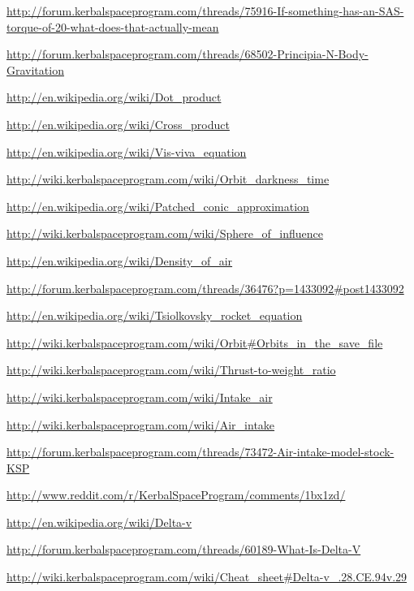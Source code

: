\documentclass[11pt]{report}
\begin{document}
\begin{thebibliography}{Kerbin}
  \url{http://forum.kerbalspaceprogram.com/threads/75916-If-something-has-an-SAS-torque-of-20-what-does-that-actually-mean}

  \url{http://forum.kerbalspaceprogram.com/threads/68502-Principia-N-Body-Gravitation}

  \url{http://en.wikipedia.org/wiki/Dot_product}

  \url{http://en.wikipedia.org/wiki/Cross_product}

  \url{http://en.wikipedia.org/wiki/Vis-viva_equation}

  \url{http://wiki.kerbalspaceprogram.com/wiki/Orbit_darkness_time}

  \url{http://en.wikipedia.org/wiki/Patched_conic_approximation}

  \url{http://wiki.kerbalspaceprogram.com/wiki/Sphere_of_influence}

  \url{http://en.wikipedia.org/wiki/Density_of_air}

  \url{http://forum.kerbalspaceprogram.com/threads/36476?p=1433092#post1433092}

  \url{http://en.wikipedia.org/wiki/Tsiolkovsky_rocket_equation}

  \url{http://wiki.kerbalspaceprogram.com/wiki/Orbit#Orbits_in_the_save_file}

  \url{http://wiki.kerbalspaceprogram.com/wiki/Thrust-to-weight_ratio}

  \url{http://wiki.kerbalspaceprogram.com/wiki/Intake_air}

  \url{http://wiki.kerbalspaceprogram.com/wiki/Air_intake}

  \url{http://forum.kerbalspaceprogram.com/threads/73472-Air-intake-model-stock-KSP}

  \url{http://www.reddit.com/r/KerbalSpaceProgram/comments/1bx1zd/}

  \url{http://en.wikipedia.org/wiki/Delta-v}

  \url{http://forum.kerbalspaceprogram.com/threads/60189-What-Is-Delta-V}

  \url{http://wiki.kerbalspaceprogram.com/wiki/Cheat_sheet#Delta-v_.28.CE.94v.29}

\end{thebibliography}
\end{document}
